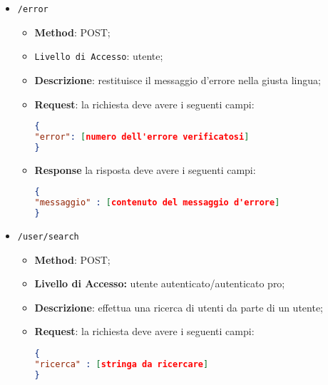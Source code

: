 \begin{itemize}
		\begin{itemize}
			\item \textbf{Method}: GET;
			\item \textbf{Livello di Accesso}: utente;
			\item \textbf{Descrizione}: restituisce un JSON contenete i nomi delle variabili nella lingua indicata;
			\item \textbf{Response}: il JSON restituito deve avere i seguenti campi:
\begin{lstlisting}[language=json,firstnumber=1]
{
"lang" : [ita | eng]
"ita" : [array JSON con associazione: "variabile" : "traduzione"]
"eng" : [array JSON con associazione: "variabile" : "traduzione"]
}
\end{lstlisting}
		\end{itemize}
	\item \texttt{/error}
		\begin{itemize}
			\item \textbf{Method}: POST;
			\item \texttt{Livello di Accesso}: utente;
			\item \textbf{Descrizione}: restituisce il messaggio d'errore nella giusta lingua;
			\item \textbf{Request}: la richiesta deve avere i seguenti campi:
\begin{lstlisting}[language=json,firstnumber=1]
{
"error": [numero dell'errore verificatosi]
}
\end{lstlisting}
			\item \textbf{Response} la risposta deve avere i seguenti campi:
\begin{lstlisting}[language=json,firstnumber=1]
{
"messaggio" : [contenuto del messaggio d'errore]
}
\end{lstlisting}
		\end{itemize}
	\item \texttt{/user/search}
	 \begin{itemize}
	 	\item \textbf{Method}: POST;
	 	\item \textbf{Livello di Accesso:} utente autenticato/autenticato pro;
	 	\item \textbf{Descrizione}: effettua una ricerca di utenti da parte di un utente;
	 	\item \textbf{Request}: la richiesta deve avere i seguenti campi:
\begin{lstlisting}[language=json,firstnumber=1]
{
"ricerca" : [stringa da ricercare]
}
\end{lstlisting} 

\end{itemize}
\end{itemize}
